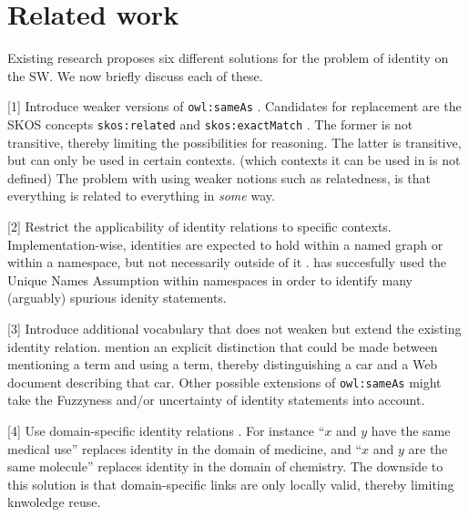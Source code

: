 \section{Related work}
\label{sec:related_work}

Existing research proposes six different solutions for
  the problem of identity on the SW.
We now briefly discuss each of these.

[1] Introduce weaker versions of {\small \texttt{owl:sameAs}}
  \cite{HalpinHayes2010,MccuskerMcguinness2010}.
Candidates for replacement are
  the SKOS concepts {\small \texttt{skos:related}}
  and {\small \texttt{skos:exactMatch}}
  \cite{MilesBechhofer2009}.
The former is not transitive,
  thereby limiting the possibilities for reasoning.
The latter is transitive,
  but can only be used in certain contexts.
  (which contexts it can be used in is not defined) \cite{MilesBechhofer2009}
The problem with using weaker notions such as relatedness,
  is that everything is related to everything in \emph{some} way.

[2] Restrict the applicability of identity relations to specific contexts.
Implementation-wise, identities are expected to hold
  within a named graph or within a namespace,
  but not necessarily outside of it \cite{HalpinHayes2010}.
\cite{Melo2013} has succesfully used the Unique Names Assumption
  within namespaces in order to identify many (arguably) spurious
  idenity statements.

[3] Introduce additional vocabulary that does not weaken but extend
  the existing identity relation.
\cite{HalpinHayes2010} mention an explicit distinction that could be made
  between mentioning a term and using a term,
  thereby distinguishing a car and a Web document describing that car.
Other possible extensions of {\small \texttt{owl:sameAs}} might take
  the Fuzzyness and/or uncertainty of identity statements into account.

[4] Use domain-specific identity relations \cite{MccuskerMcguinness2010}.
  For instance
      ``$x$ and $y$ have the same medical use''
    replaces
      identity in the domain of medicine,
  and
      ``$x$ and $y$ are the same molecule''
    replaces
      identity in the domain of chemistry.
The downside to this solution is that domain-specific links are
  only locally valid, thereby limiting knwoledge reuse.

